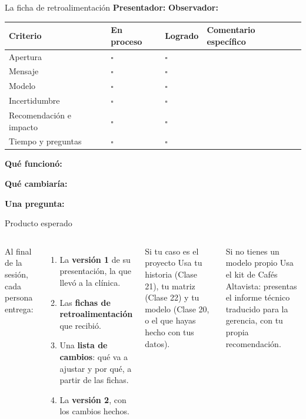 \documentclass[aspectratio=169,11pt]{beamer}
\begin{document}
\begin{frame}[t]{La ficha de retroalimentación}
  \footnotesize
  \textbf{Presentador:} \hrulefill\quad \textbf{Observador:} \hrulefill
  \vspace{0.1cm}

  \renewcommand{\arraystretch}{1.3}
  \begin{tabular}{@{}L{2.8cm}C{1.3cm}C{1.3cm}L{7.3cm}@{}}
    \toprule
    \textbf{Criterio} & \textbf{En proceso} & \textbf{Logrado} & \textbf{Comentario específico} \\
    \midrule
    Apertura & $\square$ & $\square$ & \\
    Mensaje & $\square$ & $\square$ & \\
    Modelo & $\square$ & $\square$ & \\
    Incertidumbre & $\square$ & $\square$ & \\
    Recomendación e impacto & $\square$ & $\square$ & \\
    Tiempo y preguntas & $\square$ & $\square$ & \\
    \bottomrule
  \end{tabular}
  \vspace{0.1cm}

  \textbf{Qué funcionó:} \hrulefill\par
  \textbf{Qué cambiaría:} \hrulefill\par
  \textbf{Una pregunta:} \hrulefill
\end{frame}

\begin{frame}[t]{Producto esperado}
  \begin{columns}[T,onlytextwidth]
    \small Al final de la sesión, cada persona entrega:
    \begin{enumerate}
      \footnotesize
      \item La \textbf{versión 1} de su presentación, la que llevó a la
        clínica.
      \item Las \textbf{fichas de retroalimentación} que recibió.
      \item Una \textbf{lista de cambios}: qué va a ajustar y por qué, a
        partir de las fichas.
      \item La \textbf{versión 2}, con los cambios hechos.
    \end{enumerate}
    \begin{exampleblock}{Si tu caso es el proyecto}
      \footnotesize Usa tu historia (Clase 21), tu matriz (Clase 22) y tu
      modelo (Clase 20, o el que hayas hecho con tus datos).
    \end{exampleblock}
    \begin{block}{Si no tienes un modelo propio}
      \footnotesize Usa el kit de Cafés Altavista: presentas el informe
      técnico traducido para la gerencia, con tu propia recomendación.
    \end{block}
  \end{columns}
\end{frame}
\end{document}
